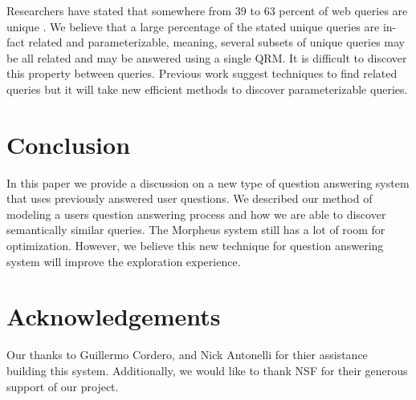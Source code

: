 Researchers have stated that somewhere from 39 to 63 percent of web
queries are unique \cite{1277770,331405,621942}.  We believe that a
large percentage of the stated unique queries are in-fact related and
parameterizable, meaning, several subsets of unique queries may be all
related and may be answered using a single QRM.  It is difficult to
discover this property between queries.  Previous work suggest
techniques to find related queries but it will take new efficient
methods to discover parameterizable queries.


\section{Conclusion}

In this paper we provide a discussion on a new type of question
answering system that uses previously answered user questions.  We
described our method of modeling a users question answering process
and how we are able to discover semantically similar queries.  The Morpheus system still has a lot of room for optimization.  However, we believe this new technique for question answering system will improve the exploration experience.


\section{Acknowledgements}
Our thanks to Guillermo Cordero, and Nick Antonelli for thier assistance building this system. Additionally, we would like to thank NSF for their generous support of our project.
